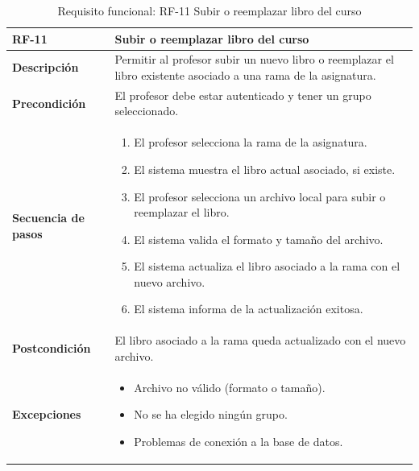 \begin{table}[H]
\centering
\begin{tabularx}{\textwidth}{
  |>{\centering\arraybackslash}l
  |>{\centering\arraybackslash}X|}
\hline
\textbf{RF-11} & \textbf{Subir o reemplazar libro del curso} \\ \hline

\textbf{Descripción} & Permitir al profesor subir un nuevo libro o reemplazar el libro existente asociado a una rama de la asignatura. \\ \hline

\textbf{Precondición} & El profesor debe estar autenticado y tener un grupo seleccionado. \\ \hline

\textbf{Secuencia de pasos} & 
\begin{enumerate}
  \item El profesor selecciona la rama de la asignatura.
  \item El sistema muestra el libro actual asociado, si existe.
  \item El profesor selecciona un archivo local para subir o reemplazar el libro.
  \item El sistema valida el formato y tamaño del archivo.
  \item El sistema actualiza el libro asociado a la rama con el nuevo archivo.
  \item El sistema informa de la actualización exitosa.
\end{enumerate} \\ \hline

\textbf{Postcondición} & El libro asociado a la rama queda actualizado con el nuevo archivo. \\ \hline

\textbf{Excepciones} & 
\begin{itemize}
  \item Archivo no válido (formato o tamaño).
  \item No se ha elegido ningún grupo.
  \item Problemas de conexión a la base de datos.
\end{itemize} \\ \hline
\end{tabularx}
\caption{Requisito funcional: RF-11 Subir o reemplazar libro del curso}
\end{table}
